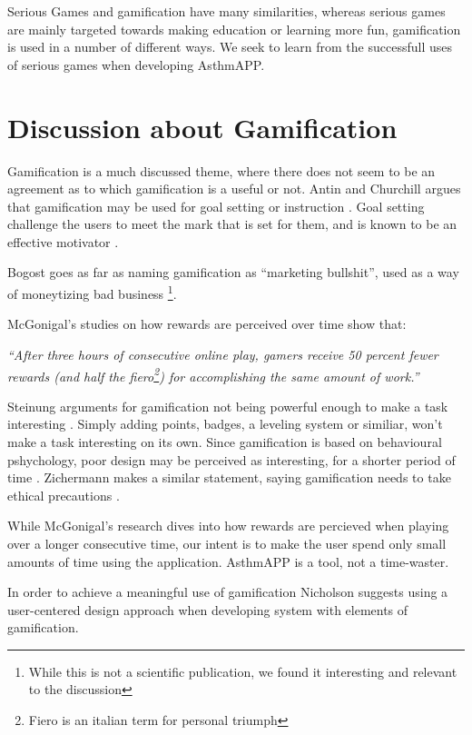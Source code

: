 Serious Games and gamification have many similarities, whereas serious games are mainly targeted towards making education or learning more fun, gamification is used in a number of different ways. We seek to learn from the successfull uses of serious games when developing AsthmAPP.


\section{Discussion about Gamification}
\label{sec:gamificationdiscussion}

Gamification is a much discussed theme, where there does not seem to be an agreement as to which gamification is a useful or not. 
Antin and Churchill argues that gamification may be used for goal setting or instruction \cite{antin2011badges}. Goal setting challenge the users to meet the mark that is set for them, and is known to be an effective motivator \cite{ling2005using}. 

Bogost goes as far as naming gamification as ``marketing bullshit'', used as a way of moneytizing bad business \cite{gamificationbullshit}\footnote{While this is not a scientific publication, we found it interesting and relevant to the discussion}.

McGonigal's studies on how rewards are perceived over time show that: 

\textit{``After three hours of consecutive online play, gamers receive 50 percent fewer rewards (and half the fiero\footnote{Fiero is an italian term for personal triumph\cite{ekman2007emotions}}) for accomplishing the same amount of work.''} \cite{jane2011reality}

Steinung arguments for gamification not being powerful enough to make a task interesting \cite{steinung2012interessante}. Simply adding points, badges, a leveling system or similiar, won't make a task interesting on its own. Since gamification is based on behavioural pshychology, poor design may be perceived as interesting, for a shorter period of time \cite{steinung2012interessante}. Zichermann makes a similar statement, saying gamification needs to take ethical precautions \cite{zichermann2011gamification}.

While McGonigal's research dives into how rewards are percieved when playing over a longer consecutive time, our intent is to make the user spend only small amounts of time using the application. AsthmAPP is a tool, not a time-waster.

In order to achieve a meaningful use of gamification Nicholson\cite{nicholson2012user} suggests using a user-centered design approach\cite{usercentereddesign} when developing system with elements of gamification. 


